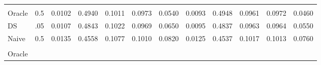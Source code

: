 \begin{tabular}{llllllllllll}
  \multicolumn{1}{r}{} &
  \multicolumn{1}{r}{} &
  \multicolumn{1}{r}{} \\
\multicolumn{1}{l}{\hspace{1em}Oracle} &
  \multicolumn{1}{|r}{0.5} &
  \multicolumn{1}{r}{0.0102} &
  \multicolumn{1}{r}{0.4940} &
  \multicolumn{1}{r}{0.1011} &
  \multicolumn{1}{r}{0.0973} &
  \multicolumn{1}{r}{0.0540} &
  \multicolumn{1}{r}{0.0093} &
  \multicolumn{1}{r}{0.4948} &
  \multicolumn{1}{r}{0.0961} &
  \multicolumn{1}{r}{0.0972} &
  \multicolumn{1}{r}{0.0460} \\
\multicolumn{1}{l}{\hspace{1em}DS} &
  \multicolumn{1}{|r}{.05} &
  \multicolumn{1}{r}{0.0107} &
  \multicolumn{1}{r}{0.4843} &
  \multicolumn{1}{r}{0.1022} &
  \multicolumn{1}{r}{0.0969} &
  \multicolumn{1}{r}{0.0650} &
  \multicolumn{1}{r}{0.0095} &
  \multicolumn{1}{r}{0.4837} &
  \multicolumn{1}{r}{0.0963} &
  \multicolumn{1}{r}{0.0964} &
  \multicolumn{1}{r}{0.0550} \\
\multicolumn{1}{l}{\hspace{1em}Naive} &
  \multicolumn{1}{|r}{0.5} &
  \multicolumn{1}{r}{0.0135} &
  \multicolumn{1}{r}{0.4558} &
  \multicolumn{1}{r}{0.1077} &
  \multicolumn{1}{r}{0.1010} &
  \multicolumn{1}{r}{0.0820} &
  \multicolumn{1}{r}{0.0125} &
  \multicolumn{1}{r}{0.4537} &
  \multicolumn{1}{r}{0.1017} &
  \multicolumn{1}{r}{0.1013} &
  \multicolumn{1}{r}{0.0760} \\
\multicolumn{1}{l}{} &
  \multicolumn{1}{|r}{} &
  \multicolumn{1}{r}{} &
  \multicolumn{1}{r}{} &
  \multicolumn{1}{r}{} &
  \multicolumn{1}{r}{} &
  \multicolumn{1}{r}{} &
  \multicolumn{1}{r}{} &
  \multicolumn{1}{r}{} &
  \multicolumn{1}{r}{} &
  \multicolumn{1}{r}{} &
  \multicolumn{1}{r}{} \\
\multicolumn{1}{l}{\hspace{1em}Oracle} &

\end{tabular}
